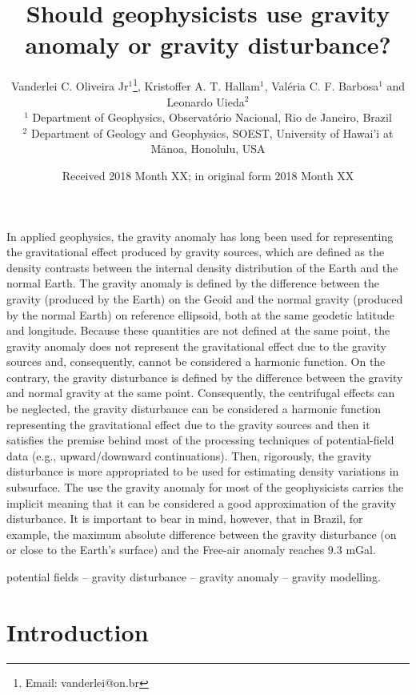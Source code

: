 \documentclass[extra]{gji}
\title[Gravity anomaly or gravity disturbance?]
      {Should geophysicists use gravity anomaly or gravity disturbance?}
\author[Oliveira Jr et al.]
{Vanderlei C. Oliveira Jr$^1$\thanks{Email: vanderlei@on.br},
Kristoffer A. T. Hallam$^{1}$, Val\'{e}ria C. F. Barbosa$^1$
and Leonardo Uieda$^2$ \\
$^1$ Department of Geophysics, Observat\'{o}rio Nacional, Rio de Janeiro, Brazil \\
$^2$ Department of Geology and Geophysics, SOEST, University of Hawai'i at M\={a}noa, Honolulu, USA
}
\date{Received 2018 Month XX; in original form 2018 Month XX}
\begin{document}
\label{firstpage}

\maketitle


\begin{summary}
 In applied geophysics, the gravity anomaly has long been used for representing the
 gravitational effect produced by gravity sources, which are defined as the density
 contrasts between the internal density distribution of the Earth and the normal Earth.
 The gravity anomaly is defined by the difference between the gravity (produced by the
 Earth) on the Geoid and the normal gravity (produced by the normal Earth)
 on reference ellipsoid, both at the same geodetic latitude and longitude.
 Because these quantities are not defined at the same point, 
 the gravity anomaly does not represent the gravitational effect due to the gravity
 sources and, consequently, cannot be considered a harmonic function.
 On the contrary, the gravity disturbance is defined by the difference between
 the gravity and normal gravity at the same point. Consequently, the centrifugal 
 effects can be neglected, the gravity disturbance can be considered a harmonic 
 function representing the gravitational effect due to the gravity sources and then 
 it satisfies the premise behind most of the processing techniques of potential-field
 data (e.g., upward/downward continuations). Then, rigorously, the gravity disturbance
 is  more appropriated to be used for estimating density variations in subsurface.
 The use the gravity anomaly for most of the geophysicists carries the
 implicit meaning that it can be considered a good approximation of the gravity
 disturbance. It is important to bear in mind, however, that in Brazil, for example, 
 the maximum absolute difference between the gravity disturbance (on or close 
 to the Earth’s surface) and the Free-air anomaly reaches 9.3 mGal.

\end{summary}

\begin{keywords}
 potential fields -- gravity disturbance -- gravity anomaly -- gravity modelling.
\end{keywords}


\section{Introduction}
\end{document}
